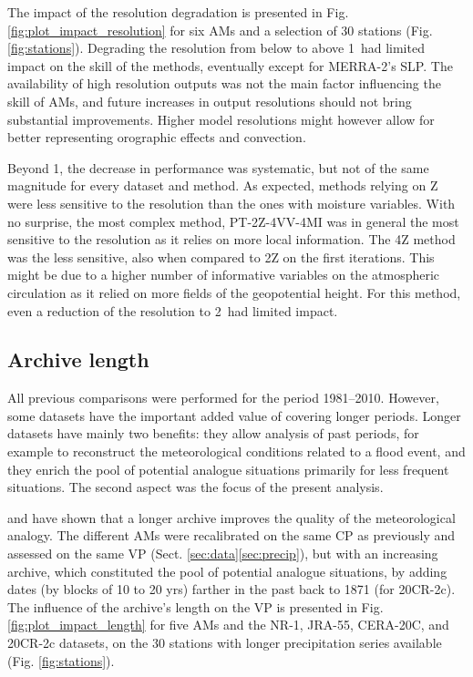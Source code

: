 \documentclass{ametsoc}
\begin{document}
The impact of the resolution degradation is presented in Fig. \ref{fig:plot_impact_resolution} for six AMs and a selection of 30 stations (Fig. \ref{fig:stations}). Degrading the resolution from below to above 1\degree\ had limited impact on the skill of the methods, eventually except for MERRA-2's SLP. The availability of high resolution outputs was not the main factor influencing the skill of AMs, and future increases in output resolutions should not bring substantial improvements. Higher model resolutions might however allow for better representing orographic effects and convection. 

Beyond 1\degree, the decrease in performance was systematic, but not of the same magnitude for every dataset and method. As expected, methods relying on Z were less sensitive to the resolution than the ones with moisture variables. With no surprise, the most complex method, PT-2Z-4VV-4MI was in general the most sensitive to the resolution as it relies on more local information. The 4Z method was the less sensitive, also when compared to 2Z on the first iterations. This might be due to a higher number of informative variables on the atmospheric circulation as it relied on more fields of the geopotential height. For this method, even a reduction of the resolution to 2\degree\ had limited impact.


\subsection{Archive length}
\label{sec:length}

All previous comparisons were performed for the period 1981--2010. However, some datasets have the important added value of covering longer periods. Longer datasets have mainly two benefits: they allow analysis of past periods, for example to reconstruct the meteorological conditions related to a flood event, and they enrich the pool of potential analogue situations primarily for less frequent situations. The second aspect was the focus of the present analysis. 

\citet{Ruosteenoja1988} and \citet{Vandendool1994} have shown that a longer archive improves the quality of the meteorological analogy. The different AMs were recalibrated on the same CP as previously and assessed on the same VP (Sect. \ref{sec:data}\ref{sec:precip}), but with an increasing archive, which constituted the pool of potential analogue situations, by adding dates (by blocks of 10 to 20 yrs) farther in the past back to 1871 (for 20CR-2c). The influence of the archive's length on the VP is presented in Fig. \ref{fig:plot_impact_length} for five AMs and the NR-1, JRA-55, CERA-20C, and 20CR-2c datasets, on the 30 stations with longer precipitation series available (Fig. \ref{fig:stations}). 
\end{document}

